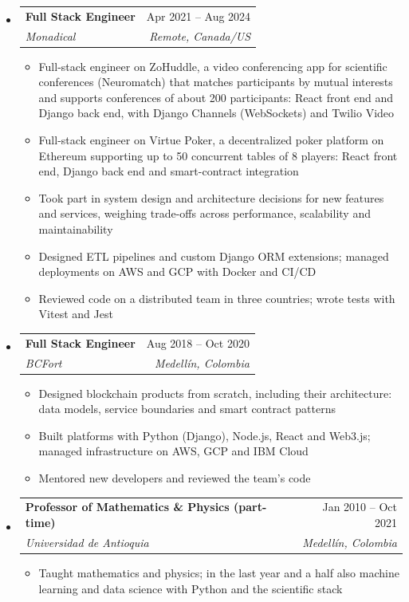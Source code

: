 \documentclass[letterpaper,10pt]{article}
\makeatletter
\newcommand{\resumeSubheading}[4]{
  \vspace{-2pt}
  \item[]
  \begin{tabular*}{\textwidth}{@{\extracolsep{\fill}}l r}
    \textbf{#1} & #2 \\
    \textit{#3} & \textit{#4} \\
  \end{tabular*}
  \vspace{-5pt}
}
\makeatother
\begin{document}
\begin{itemize}[leftmargin=0pt, itemindent=0pt, label={}, itemsep=1pt]
\begin{itemize}[leftmargin=*, itemsep=0pt]
    \item Ran technical design sessions with clients, translating business requirements into system architectures
\end{itemize}
\resumeSubheading
{Full Stack Engineer}{Apr 2021 -- Aug 2024}
{Monadical}{Remote, Canada/US}
\begin{itemize}[leftmargin=*, itemsep=0pt]
    \item Full-stack engineer on ZoHuddle, a video conferencing app for scientific conferences (Neuromatch) that matches participants by mutual interests and supports conferences of about 200 participants: React front end and Django back end, with Django Channels (WebSockets) and Twilio Video
    \item Full-stack engineer on Virtue Poker, a decentralized poker platform on Ethereum supporting up to 50 concurrent tables of 8 players: React front end, Django back end and smart-contract integration
    \item Took part in system design and architecture decisions for new features and services, weighing trade-offs across performance, scalability and maintainability
    \item Designed ETL pipelines and custom Django ORM extensions; managed deployments on AWS and GCP with Docker and CI/CD
    \item Reviewed code on a distributed team in three countries; wrote tests with Vitest and Jest
\end{itemize}
\resumeSubheading
{Full Stack Engineer}{Aug 2018 -- Oct 2020}
{BCFort}{Medell\'in, Colombia}
\begin{itemize}[leftmargin=*, itemsep=0pt]
    \item Designed blockchain products from scratch, including their architecture: data models, service boundaries and smart contract patterns
    \item Built platforms with Python (Django), Node.js, React and Web3.js; managed infrastructure on AWS, GCP and IBM Cloud
    \item Mentored new developers and reviewed the team's code
\end{itemize}
\resumeSubheading
{Professor of Mathematics \& Physics (part-time)}{Jan 2010 -- Oct 2021}
{Universidad de Antioquia}{Medell\'in, Colombia}
\begin{itemize}[leftmargin=*, itemsep=0pt]
    \item Taught mathematics and physics; in the last year and a half also machine learning and data science with Python and the scientific stack
\end{itemize}
\end{itemize}
\end{document}
